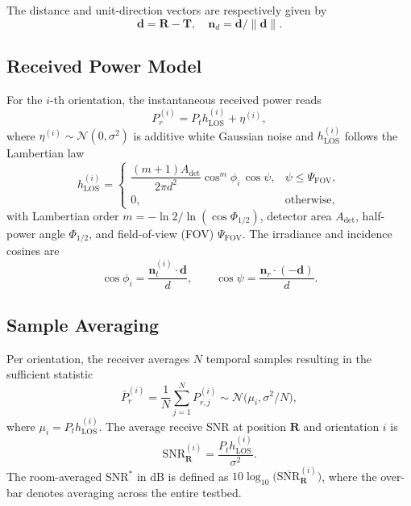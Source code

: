 \documentclass[lettersize,journal]{IEEEtran}
\begin{document}
The distance and unit-direction vectors are respectively given by
\[\mathbf d = \mathbf R - \mathbf T,\quad \mathbf n_d = \mathbf d / \|\mathbf d\|.\]

\subsection{Received Power Model}
For the $i$-th orientation, the instantaneous received power reads
\begin{equation}
P_{r}^{(i)} = P_t h_{\mathrm{LOS}}^{(i)} + \eta^{(i)},
\label{eq:received_power}
\end{equation}
where $\eta^{(i)} \sim \mathcal N(0,\sigma^2)$ is additive white Gaussian noise and $h_{\mathrm{LOS}}^{(i)}$ follows the Lambertian law
\begin{equation}
 h_{\mathrm{LOS}}^{(i)} =
 \begin{cases}
   \dfrac{(m+1)A_{\mathrm{det}}}{2\pi d^{2}} \cos^{m}\!\phi_i\, \cos\psi, & \psi \le \Psi_{\mathrm{FOV}},\\[6pt]
   0, & \text{otherwise},
 \end{cases}
\label{eq:h_los}
\end{equation}
with Lambertian order $m=-\ln2/\ln(\cos\Phi_{1/2})$, detector area $A_{\mathrm{det}}$, half-power angle $\Phi_{1/2}$, and field-of-view (FOV) $\Psi_{\mathrm{FOV}}$.  The irradiance and incidence cosines are
\begin{equation}
  \cos\phi_i = \frac{\mathbf n_t^{(i)}\!\cdot\mathbf d}{d},\qquad
  \cos\psi   = \frac{\mathbf n_r\!\cdot(-\mathbf d)}{d}.
\label{eq:cosenos}
\end{equation}

\subsection{Sample Averaging}
Per orientation, the receiver averages $N$ temporal samples resulting in the sufficient statistic
\begin{equation}
 \bar P_r^{(i)} = \frac{1}{N}\sum_{j=1}^{N} P_{r,j}^{(i)} \sim \mathcal N\!\bigl(\mu_i,\sigma^2/N\bigr),
\label{eq:promedios}
\end{equation}
where $\mu_i = P_t h_{\mathrm{LOS}}^{(i)}$.
The average receive SNR at position $\mathbf R$ and orientation $i$ is
\begin{equation}
 \mathrm{SNR}_{\mathbf R}^{(i)} = \frac{P_t h_{\mathrm{LOS}}^{(i)}}{\sigma^2}.
\end{equation}
The room-averaged SNR$^{\!*}$ in dB is defined as $10\log_{10}\bigl(\overline{\mathrm{SNR}}_{\mathbf R}^{(i)}\bigr)$, where the over-bar denotes averaging across the entire testbed.
\end{document}
